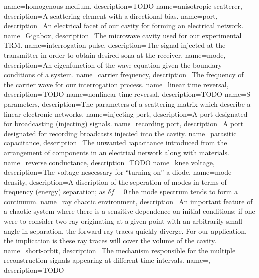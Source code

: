 {
   name=homogenous medium,
  description={TODO}
}
{
   name=anisotropic scatterer,
  description={A scattering element with a directional bias.}
}
{
   name=port,
  description={An electrical facet of our cavity for forming an electrical network.}
}
{
   name=Gigabox,
  description={The microwave cavity used for our experimental TRM.}
}
{
   name=interrogation pulse,
  description={The signal injected at the transmitter in order to obtain desired sona at the receiver.}
}
{
   name=mode,
  description={An eigenfunction of the wave equation given the boundary conditions of a system.}
}
{
   name=carrier frequency,
  description={The frequency of the carrier wave for our interrogation process.}
}
{
   name=linear time reversal,
  description={TODO}
}
{
   name=nonlinear time reversal,
  description={TODO}
}
{
   name=S parameters,
  description={The parameters of a scattering matrix which describe a linear electronic networks.}
}
{
   name=injecting port,
  description={A port designated for broadcasting (injecting) signals.}
}
{
   name=recording port,
  description={A port designated for recording broadcasts injected into the cavity.}
}
{
   name=parasitic capacitance,
  description={The unwanted capacitance introduced from the arrangement of components in an electrical network along with materials.}
}
{
   name=reverse conductance,
  description={TODO}
}
{
   name=knee voltage,
  description={The voltage nescessary for ``turning on'' a diode.}
}
{
   name=mode density,
  description={A discription of the seperation of modes in terms of frequency (energy) separation; as $\delta f = 0$ the mode spectrum tends to form a continuum.}
}
{
   name=ray chaotic environment,
  description={An important feature of a chaotic system where there is a sensitive dependence on initial conditions; if one were to consider two ray originating at a given point with an arbitrarily small angle in separation, the forward ray traces quickly diverge. For our application, the implication is these ray traces will cover the volume of the cavity.}
}
{
   name=short-orbit,
  description={The mechanism responsible for the multiple reconstruction signals appearing at different time intervals. }
}
\newglossaryentry{}
{
   name=,
  description={TODO}
}

